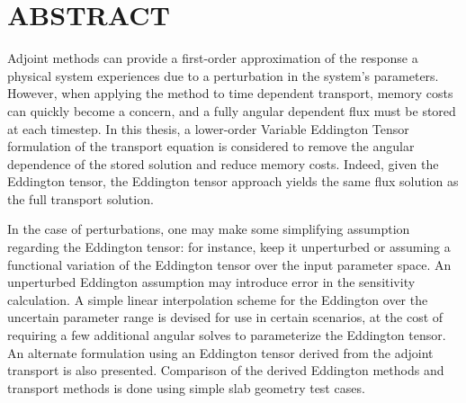 
\chapter*{ABSTRACT}

\pagestyle{plain} %
\setcounter{page}{2}

Adjoint methods can provide a first-order approximation of the response a physical system experiences due to a perturbation in the system's parameters. However, when applying the method to time dependent transport, memory costs can quickly become a concern, and a fully angular dependent flux must be stored at each timestep. In this thesis, a lower-order Variable Eddington Tensor formulation of the transport equation is considered to remove the angular dependence of the stored solution and reduce memory costs. Indeed, given the Eddington tensor, the Eddington tensor approach yields the same flux solution as the full transport solution.

In the case of perturbations, one may make some simplifying assumption regarding the Eddington tensor: for instance, keep it unperturbed or assuming a functional variation of the Eddington tensor over the input parameter space. An unperturbed Eddington assumption may introduce error in the sensitivity calculation. A simple linear interpolation scheme for the Eddington over the uncertain parameter range is devised for use in certain scenarios, at the cost of requiring a few additional angular solves to parameterize the Eddington tensor. An alternate formulation using an Eddington tensor derived from the adjoint transport is also presented. Comparison of the derived Eddington methods and transport methods is done using simple slab geometry test cases.


 

\pagebreak{}

